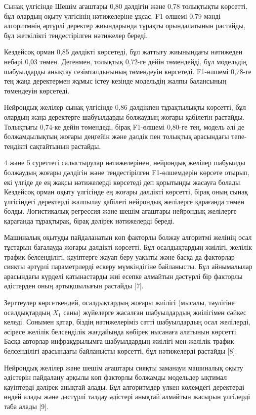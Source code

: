 \documentclass[
]{article}
\begin{document}
Сынақ үлгісінде Шешім ағаштары 0,80 дәлдігін және 0,78 толықтықты
көрсетті, бұл олардың оқыту үлгісінің нәтижелеріне ұқсас. F1 өлшемі 0,79
мәнді алгоритмнің әртүрлі деректер жиындарында тұрақты орындалатынын
растайды, бұл жеткілікті теңдестірілген нәтижелер береді.

Кездейсоқ орман 0,85 дәлдікті көрсетеді, бұл жаттығу жиынындағы
нәтижеден небәрі 0,03 төмен. Дегенмен, толықтық 0,72-ге дейін
төмендейді, бұл модельдің шабуылдарды анықтау сезімталдығының төмендеуін
көрсетеді. F1-өлшемі 0,78-ге тең жаңа деректермен жұмыс істеу кезінде
модельдің жалпы балансының төмендеуін көрсетеді.

Нейрондық желілер сынақ үлгісінде 0,86 дәлдікпен тұрақтылықты көрсетті,
бұл олардың жаңа деректерге шабуылдарды болжаудың жоғары қабілетін
растайды. Толықтығы 0,74-ке дейін төмендеді, бірақ F1-өлшемі 0,80-ге
тең, модель әлі де болжамдылықтың жоғары деңгейін және дәлдік пен
толықтық арасындағы тепе-теңдікті сақтайтынын растайды.

4 және 5 суреттегі салыстырулар нәтижелерінен, нейрондық желілер
шабуылды болжаудың жоғары дәлдігін және теңдестірілген F1-өлшемдерін
көрсете отырып, екі үлгіде де ең жақсы нәтижелерді көрсетеді деп
қорытынды жасауға болады. Кездейсоқ орман оқыту үлгісінде ең жоғары
дәлдікті көрсетті, бірақ оның сынақ үлгісіндегі деректерді жалпылау
қабілеті нейрондық желілерге қарағанда төмен болды. Логистикалық
регрессия және шешім ағаштары нейрондық желілерге қарағанда тұрақтырақ,
бірақ дәлірек нәтижелерді береді.

Машиналық оқытуды пайдаланатын көп факторлы болжау алгоритмі желінің
осал тұстарын бағалауда жоғары дәлдікті көрсетті. Бұл осалдықтардың
жиілігі, желілік трафик белсенділігі, қауіптерге жауап беру уақыты және
басқа да факторлар сияқты әртүрлі параметрлерді ескеру мүмкіндігіне
байланысты. Бұл айнымалылар арасындағы күрделі қатынастарды жиі есепке
алмайтын дәстүрлі бір факторлы әдістерден оның артықшылығын растайды
{[}7{]}.

Зерттеулер көрсеткендей, осалдықтардың жоғары жиілігі (мысалы, тәулігіне
осалдықтардың \(X_{1}\) саны) жүйелерге жасалған шабуылдардың жиілігімен
сәйкес келеді. Сонымен қатар, біздің нәтижелеріміз сәтті шабуылдардың
осал желілерді, әсіресе желілік белсенділік жағдайында көбірек нысанаға
алатынын көрсетті. Басқа авторлар инфрақұрылымға шабуылдардың жиілігі
мен желілік трафик белсенділігі арасындағы байланысты көрсетті, бұл
нәтижелерді растайды {[}8{]}.

Нейрондық желілер және шешім ағаштары сияқты заманауи машиналық оқыту
әдістерін пайдалану арқылы көп факторлы болжамды модельдер ықтимал
қауіптерді дәлірек анықтай алады. Бұл алгоритмдер үлкен көлемдегі
деректерді өңдей алады және дәстүрлі талдау әдістері анықтай алмайтын
жасырын үлгілерді таба алады {[}9{]}.
\end{document}
